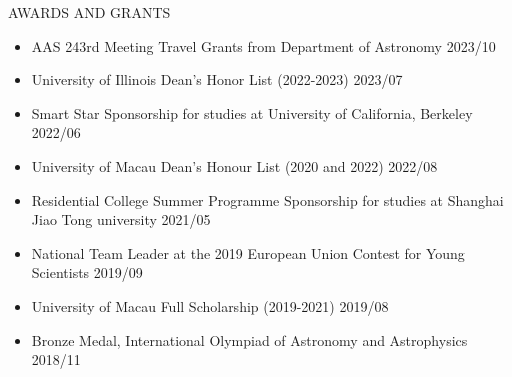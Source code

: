 \documentclass[10pt]{article} %
\begin{document}
\begin{section}{AWARDS AND GRANTS}

    \begin{itemize}[leftmargin=1.5em]
        \item AAS 243rd Meeting Travel Grants from Department of Astronomy \hfill 2023/10
        \item University of Illinois Dean's Honor List (2022-2023) \hfill 2023/07
        \item Smart Star Sponsorship for studies at University of California, Berkeley \hfill 2022/06
        \item University of Macau Dean's Honour List (2020 and 2022) \hfill 2022/08
        \item Residential College Summer Programme Sponsorship for studies at Shanghai Jiao Tong university \hfill 2021/05
        \item National Team Leader at the 2019 European Union Contest for Young Scientists \hfill 2019/09
        \item University of Macau Full Scholarship (2019-2021) \hfill 2019/08
        \item Bronze Medal, International Olympiad of Astronomy and Astrophysics \hfill 2018/11
    \end{itemize}
        
\end{section}
\end{document}
